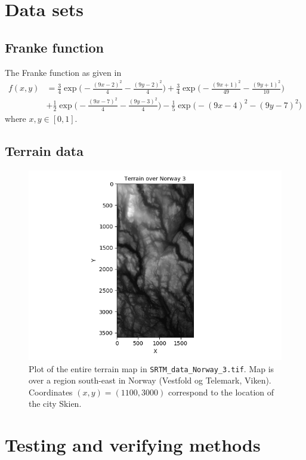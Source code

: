 \documentclass[a4paper]{article}
\begin{document}
\section{Data sets} \label{app:datasets}
\subsection{Franke function} \label{app:Franke}
The Franke function as given in \cite{Franke}
\begin{align*}
	f(x,y) &= \frac{3}{4}\exp\bigg(-\frac{(9x-2)^2}{4} - \frac{(9y-2)^2}{4}\bigg)
	+\frac{3}{4}\exp\bigg(-\frac{(9x+1)^2}{49} - \frac{(9y+1)^2}{10}\bigg)\\
	&+\frac{1}{2}\exp\bigg(-\frac{(9x-7)^2}{4} - \frac{(9y-3)^2}{4}\bigg)
	-\frac{1}{5}\exp\big(-(9x-4)^2 - (9y-7)^2\big)
\end{align*}
where $x,y \in [0, 1]$.

\subsection{Terrain data} \label{app:terrain}
\begin{figure}[H]
	\centering
	\includegraphics[scale=0.8]{../figures/task_f/entire_map.png}
	\caption{Plot of the entire terrain map in \texttt{SRTM\_data\_Norway\_3.tif}. Map is over a region south-east in Norway (Vestfold og Telemark, Viken). Coordinates $(x,y) = (1100, 3000)$ correspond to the location of the city Skien.}
	\label{fig:entiremap}
\end{figure}

\section{Testing and verifying methods} \label{app:testing}
\end{document}
